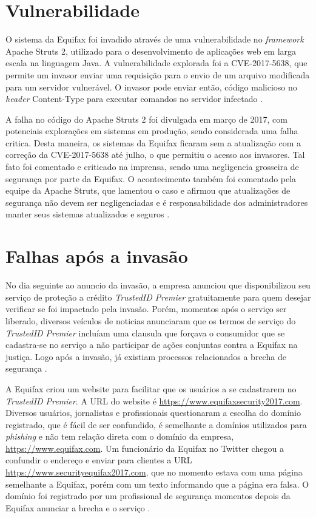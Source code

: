 \documentclass[conference]{IEEEtran}
\begin{document}
\section{Vulnerabilidade}
O sistema da Equifax foi invadido através de uma vulnerabilidade no \textit{framework} Apache Struts 2, utilizado para o desenvolvimento de aplicações web em larga escala na linguagem Java. A vulnerabilidade explorada
foi a CVE-2017-5638, que permite um invasor enviar uma requisição para o envio de um arquivo modificada para um servidor vulnerável. O invasor pode enviar então, código malicioso no \textit{header} Content-Type para
executar comandos no servidor infectado \cite{Luszcz2018} \cite{Sahu2017}.

A falha no código do Apache Struts 2 foi divulgada em março de 2017, com potenciais explorações em sistemas em produção, sendo considerada uma falha critica. Desta maneira, os 
sistemas da Equifax ficaram sem a atualização com a correção da CVE-2017-5638 até julho, o que permitiu o acesso aos invasores. Tal fato foi comentado e criticado na imprensa, 
sendo uma negligencia grosseira de segurança por parte da Equifax. O acontecimento também foi comentado pela equipe da Apache Struts, que lamentou o caso e afirmou que 
atualizações de segurança não devem ser negligenciadas e é responsabilidade dos administradores manter seus sistemas atualizados e seguros \cite{Newman2017} \cite{Goodin2017} 
\cite{Dignan2017} \cite{Struts20171} \cite{Struts20172}.

\section{Falhas após a invasão}
No dia seguinte ao anuncio da invasão, a empresa anunciou que disponibilizou seu serviço de proteção a crédito \textit{TrustedID Premier} gratuitamente para quem desejar verificar se foi impactado pela invasão. 
	Porém, momentos após o serviço ser liberado, diversos veículos de noticias anunciaram que os termos de serviço do \textit{TrustedID Premier} incluíam uma clausula que forçava o consumidor que se cadastra-se
no serviço a não participar de ações conjuntas contra a Equifax na justiça. Logo após a invasão, já existiam processos relacionados a brecha de segurança \cite{Mosendz2017} \cite{Robertson2017} \cite{Grant2017}.

A Equifax criou um website para facilitar que os usuários a se cadastrarem no \textit{TrustedID Premier}. A URL do website é \url{https://www.equifaxsecurity2017.com}. Diversos usuários, jornalistas e profissionais 
questionaram a escolha do domínio registrado, que é fácil de ser confundido, é semelhante a domínios utilizados para \textit{phishing} e não tem relação direta com o domínio da empresa, \url{https://www.equifax.com}.
Um funcionário da Equifax no Twitter chegou a confundir o endereço e enviar para clientes a URL \url{https://www.securityequifax2017.com}, que no momento estava com uma página semelhante a Equifax, porém com um texto
informando que a página era falsa. O domínio foi registrado por um profissional de segurança momentos depois da Equifax anunciar a brecha e o serviço \cite{Mak2017} \cite{Deahl2017} \cite{Burns2017}. 
\end{document}
